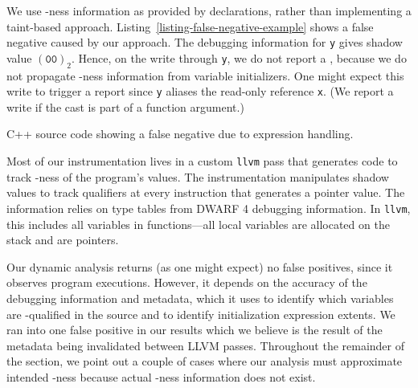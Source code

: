 We use \const{}-ness information as provided by declarations,
rather than implementing a taint-based approach.
Listing~\ref{listing-false-negative-example} shows a false negative caused by
our approach.
The debugging information for \texttt{y} gives shadow value
$(\texttt{00})_2$.
Hence, on the write through \texttt{y}, we do not report a \wtc{},
because we do not propagate \const{}-ness information from variable
initializers.
One might expect this write to trigger a report since \texttt{y} aliases
the read-only reference \texttt{x}.
(We report a write if the cast is part of a function argument.)

\begin{listing}[ht]
  \caption{C++ source code showing a false negative due to expression handling.}
  \label{listing-false-negative-example}
  \centering
  
\end{listing}

Most of our instrumentation lives in a custom \texttt{llvm} pass that
generates code to track \const{}-ness of the program's values.
The instrumentation manipulates shadow values to track \const{} qualifiers at
every instruction that generates a pointer value.
The \const{} information relies on type tables from DWARF 4 debugging
information.
In \texttt{llvm}, this includes all variables in functions---all local
variables are allocated on the stack and are pointers.

Our dynamic analysis returns (as one might expect) no false positives, since it
observes program executions.
However, it depends on the accuracy of the debugging information and
metadata, which it uses to identify which variables are \const{}-qualified in
the source and to identify initialization expression extents.
We ran into one false positive in our results which we believe is the result of
the metadata being invalidated between LLVM passes.
Throughout the remainder of the section, we point out a couple of cases where
our analysis must approximate intended \const{}-ness because actual
\const{}-ness information does not exist.

